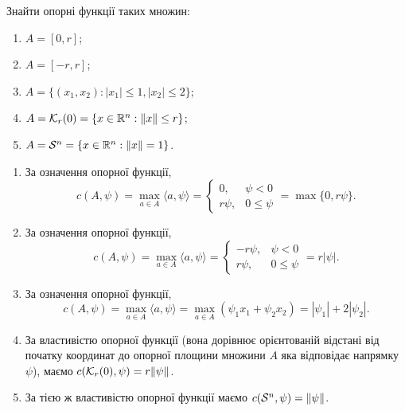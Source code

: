 \begin{problem}
	Знайти опорні функції таких множин:

	\begin{enumerate}
		\item $A = [0, r]$;

		\item $A = [-r, r]$;

		\item $A = \{ (x_1, x_2): |x_1| \le 1, |x_2| \le 2 \}$;

		\item $A = \mathcal{K}_r (0) = \{ x \in \mathbb{R}^n: \|x\| \le r \}$;

		\item $A = \mathcal{S}^n = \{ x \in \mathbb{R}^n: \|x\| = 1 \}$.
	\end{enumerate}
\end{problem}

\begin{solution}
	\begin{enumerate}
		\item За означення опорної функції, \[ c(A, \psi) = \max_{a \in A} \langle a, \psi \rangle = \begin{cases} 0, & \psi < 0 \\ r \psi, & 0 \le \psi \end{cases} = \max \{ 0, r \psi \}. \]

		\item За означення опорної функції, \[ c(A, \psi) = \max_{a \in A} \langle a, \psi \rangle = \begin{cases} - r \psi, & \psi < 0 \\ r \psi, & 0 \le \psi \end{cases} = r |\psi |. \]

		\item За означення опорної функції, \[ c(A, \psi) = \max_{a \in A} \langle a, \psi \rangle = \max_{a \in A} (\psi_1 x_1 + \psi_2 x_2) = |\psi_1| + 2 |\psi_2|. \]

		\item За властивістю опорної функції (вона дорівнює орієнтованій відстані від початку координат до опорної площини множини $A$ яка відповідає напрямку $\psi$), маємо $c(\mathcal{K}_r (0), \psi) = r \| \psi \|$.

		\item За тією ж властивістю опорної функції маємо $c(\mathcal{S}^n, \psi) = \| \psi \|$.
	\end{enumerate}
\end{solution}

